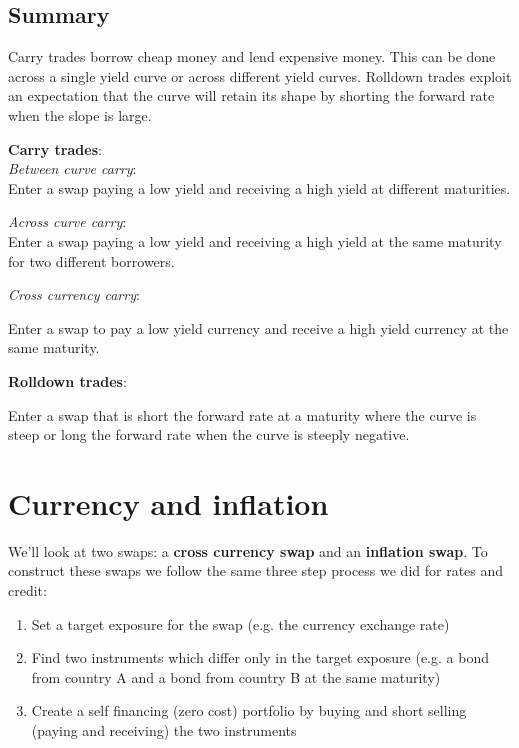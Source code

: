 \subsection{Summary}

Carry trades borrow cheap money and lend expensive money. This can be done across a single yield curve or across different yield curves. Rolldown trades exploit an expectation that the curve will retain its shape by shorting the forward rate when the slope is large.


\textbf{Carry trades}:\\

\textit{Between curve carry}:\\

Enter a swap paying a low yield and receiving a high yield at different maturities.

\textit{Across curve carry}:\\

Enter a swap paying a low yield and receiving a high yield at the same maturity for two different borrowers.

\textit{Cross currency carry}:

Enter a swap to pay a low yield currency and receive a high yield currency at the same maturity.

\textbf{Rolldown trades}:

Enter a swap that is short the forward rate at a maturity where the curve is steep or long the forward rate when the curve is steeply negative.

\section{Currency and inflation}

We'll look at two swaps: a \textbf{cross currency swap} and an \textbf{inflation swap}. To construct these swaps we follow the same three step process we did for rates and credit:

\begin{enumerate}
\item Set a target exposure for the swap (e.g. the currency exchange rate)\\
\item Find two instruments which differ only in the target exposure (e.g. a bond from country A and a bond from country B at the same maturity)\\
\item Create a self financing (zero cost) portfolio by buying and short selling (paying and receiving) the two instruments\\
\end{enumerate}

